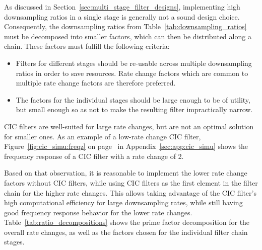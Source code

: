 As  discussed  in  Section~\ref{sec:multi_stage_filter_designs},  implementing
high   downsampling   ratios   in   a    single   stage   is   generally   not
a   sound   design   choice. Consequently,  the   downsampling   ratios   from
Table~\ref{tab:downsampling_ratios} must  be decomposed into  smaller factors,
which can then be distributed along a chain. These factors must fulfill the
following criteria:
\begin{itemize}\tightlist
    \item
        Filters  for  different stages  should  be  re-usable across  multiple
        downsampling ratios  in order  to save resources. Rate  change factors
        which  are  common  to  multiple rate  change  factors  are  therefore
        preferred.
    \item
        The factors for the individual stages  should be large enough to be of
        utility,  but small  enough so  as not  to make  the resulting  filter
        impractically narrow.
\end{itemize}
CIC  filters  are  well-suited  for  large   rate  changes,  but  are  not  an
optimal solution  for smaller  ones. As an  example of  a low-rate  change CIC
filter,  Figure~\ref{fig:cic_simu:freqz} on  page~\pageref{fig:cic_simu:freqz}
in  Appendix~\ref{sec:app:cic_simu}  shows the  frequency  response  of a  CIC
filter with a rate change of \num{2}.

Based on that observation, it is reasonable to implement the lower rate change
factors without CIC  filters, while using CIC filters as  the first element in
the filter  chain for  the higher rate  changes. This allows  taking advantage
of  the CIC  filter's  high computational  efficiency  for large  downsampling
rates,  while still  having good  frequency  response behavior  for the  lower
rate  changes. Table~\ref{tab:ratio_decompositions}  shows  the  prime  factor
decomposition for the overall rate changes,  as well as the factors chosen for
the individual filter chain stages.

